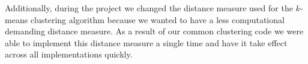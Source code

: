 Additionally, during the project we changed the distance measure used for the $k$-means clustering algorithm because we wanted to have a less computational demanding distance measure. As a result of our common clustering code we were able to implement this distance measure a single time and have it take effect across all implementations quickly.


\worksheetend